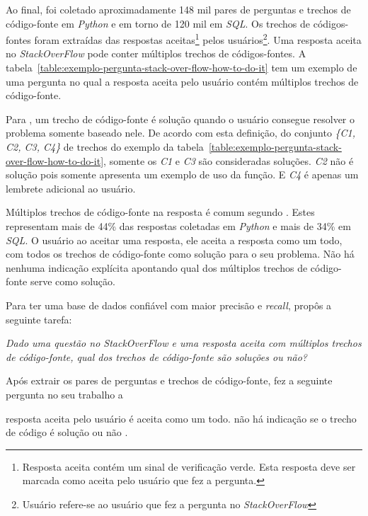 Ao final, foi coletado aproximadamente 148 mil pares de perguntas e trechos de código-fonte em \emph{Python} e em torno de 120 mil em \emph{SQL}. Os trechos de códigos-fontes foram extraídas das respostas aceitas\footnote{Resposta aceita contém um sinal de verificação verde. Esta resposta deve ser marcada como aceita pelo usuário que fez a pergunta.} pelos usuários\footnote{Usuário refere-se ao usuário que fez a pergunta no \textit{StackOverFlow}}. Uma resposta aceita no \textit{StackOverFlow} pode conter múltiplos trechos de códigos-fontes. A tabela~\ref{table:exemplo-pergunta-stack-over-flow-how-to-do-it} tem um exemplo de uma pergunta no qual a resposta aceita pelo usuário contém múltiplos trechos de código-fonte.

Para \cite{yao-2018}, um trecho de código-fonte é solução quando o usuário consegue resolver o problema somente baseado nele.
De acordo com esta definição, do conjunto \emph{\{C1, C2, C3, C4\}} de trechos do exemplo da tabela~\ref{table:exemplo-pergunta-stack-over-flow-how-to-do-it}, somente os \emph{C1} e \emph{C3} são consideradas soluções. \emph{C2} não é solução pois somente apresenta um exemplo de uso da função. E \emph{C4} é apenas um lembrete adicional ao usuário.

Múltiplos trechos de código-fonte na resposta é comum segundo \cite{yao-2018}. Estes representam mais de 44\% das respostas coletadas em \textit{Python} e mais de 34\% em \textit{SQL}. O usuário ao aceitar uma resposta, ele aceita a resposta como um todo, com todos os trechos de código-fonte como solução para o seu problema. Não há nenhuma indicação explícita apontando qual dos múltiplos trechos de código-fonte serve como solução. 

Para ter uma base de dados confiável com maior precisão e \textit{recall}, \cite{yao-2018} propôs a seguinte tarefa:

\emph{Dado uma questão no \textit{StackOverFlow} e uma resposta aceita com múltiplos trechos de código-fonte, qual dos trechos de código-fonte são soluções ou não?}

Após extrair os pares de perguntas e trechos de código-fonte, \cite{yao-2018} fez a seguinte pergunta no seu trabalho a 

resposta aceita pelo usuário é aceita como um todo. não há indicação se o trecho de código é solução ou não .




